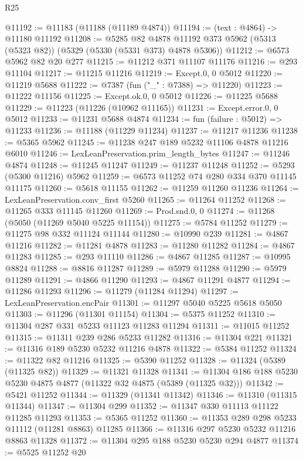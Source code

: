 \begin{lexlean}{R25}
\begin{coremodule}
@11192 := @11183 (@11188 (@11189 @4874))
@11194 := (text : @4864) -> @11180 @11192
@11208 := @5285
    @82
    @4878
    @11192
    @373
    @5962
    (@5313 (@5323 @82))
    (@5329 (@5330 (@5331 @373) @4878 @5306))
@11212 := @6573 @5962 @82 @20 @277
@11215 := @11212 @371 @11107 @11176
@11216 := @293 @11104
@11217 := @11215 @11216
@11219 := Except.{0, 0} @5012
@11220 := @11219 @5688
@11222 := @7387 (fun ("_" : @7388) => @11220)
@11223 := @11222 @11156
@11225 := Except.ok.{0, 0} @5012
@11226 := @11225 @5688
@11229 := @11223 (@11226 (@10962 @11165))
@11231 := Except.error.{0, 0} @5012
@11233 := @11231 @5688 @4874
@11234 := fun (failure : @5012) => @11233
@11236 := @11188 (@11229 @11234)
@11237 := @11217 @11236
@11238 := @5365 @5962
@11245 := @11238 @247 @189 @5232 @11106 @4878 @11216 @6010
@11246 := LexLeanPreservation.prim_length_bytes
@11247 := @11246 @4874
@11248 := @11245 @11247
@11249 := @11237 @11248
@11252 := @5293 (@5300 @11216) @5962
@11259 := @6573 @11252 @74 @280 @334 @370 @11145 @11175
@11260 := @5618 @11155
@11262 := @11259 @11260 @11236
@11264 := LexLeanPreservation.conv_first @5260
@11265 := @11264 @11252
@11268 := @11265 @333 @11145 @11260
@11269 := Prod.snd.{0, 0}
@11274 := @11268 (@5050 (@11269 @5040 @5225 @11154))
@11275 := @5784 @11252
@11279 := @11275 @98 @332 @11124 @11144
@11280 := @10990 @239
@11281 := @4867 @11216
@11282 := @11281 @4878
@11283 := @11280 @11282
@11284 := @4867 @11283
@11285 := @293 @11110
@11286 := @4867 @11285
@11287 := @10995 @8824
@11288 := @8816 @11287
@11289 := @5979 @11288
@11290 := @5979 @11289
@11291 := @4866 @11290
@11293 := @4867 @11291 @4877
@11294 := @11286 @11293
@11296 := @11279 (@11284 @11294)
@11297 := LexLeanPreservation.encPair
@11301 := @11297 @5040 @5225 @5618 @5050
@11303 := @11296 (@11301 @11154)
@11304 := @5375 @11252
@11310 := @11304 @287 @331 @5233 @11123 @11283 @11294
@11311 := @11015 @11252
@11315 := @11311 @239 @286 @5233 @11282
@11316 := @11304 @221
@11321 := @11316 @189 @5230 @5232 @11216 @4878
@11322 := @5384 @11252
@11324 := @11322 @82 @11216
@11325 := @5390 @11252
@11328 := @11324 (@5389 (@11325 @82))
@11329 := @11321 @11328
@11341 := @11304 @186 @188 @5230 @5230 @4875 @4877 (@11322 @32 @4875 (@5389 (@11325 @32)))
@11342 := @5421 @11252
@11344 := @11329 (@11341 @11342)
@11346 := @11310 (@11315 @11344)
@11347 := @11304 @299
@11352 := @11347 @330 @11113 @11122 @11285 @11293
@11353 := @5365 @11252
@11360 := @11353 @289 @298 @5233 @11112 (@11281 @8863) @11285
@11366 := @11316 @297 @5230 @5232 @11216 @8863 @11328
@11372 := @11304 @295 @188 @5230 @5230 @294 @4877
@11374 := @5525 @11252 @20

\end{coremodule}
\end{lexlean}
